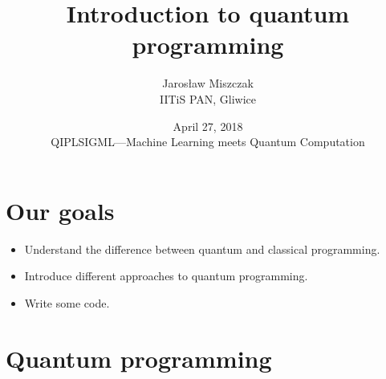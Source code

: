 \documentclass{beamer}
\title[A]{Introduction to quantum programming}
\author{Jaros\l aw Miszczak\\ IITiS PAN, Gliwice}
\date{April 27, 2018\\ QIPLSIGML---Machine Learning meets Quantum Computation}
\begin{document}
\begin{frame}{}
   \maketitle 
\end{frame}

\begin{frame}{}
  \tableofcontents[hideallsubsections]
\end{frame}

\section{Our goals}

\begin{frame}{\insertsection}{\insertsubsection}
    \begin{itemize}
        \item<1-> Understand the difference between quantum and classical 
        programming.
        \item<2-> Introduce different approaches to quantum programming.
        \item<3-> Write some code.\\ 
    \end{itemize}
\end{frame}


\section{Quantum programming}

\begin{frame}
    \begin{center}
        {\color{iitis-orange} \LARGE \insertsection}
    \end{center}
\end{frame}
\end{document}
